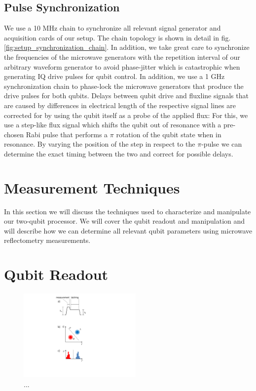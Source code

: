 \subsection{Pulse Synchronization}

We use a 10 MHz chain to synchronize all relevant signal generator and acquisition cards of our setup. The chain topology is shown in detail in fig. \ref{fig:setup_synchronization_chain}. In addition, we take great care to synchronize the frequencies of the microwave generators with the repetition interval of our arbitrary waveform generator to avoid phase-jitter which is catastrophic when generating IQ drive pulses for qubit control. In addition, we use a 1 GHz synchronization chain to phase-lock the microwave generators that produce the drive pulses for both qubits. Delays between qubit drive and fluxline signals that are caused by differences in electrical length of the respective signal lines are corrected for by using the qubit itself as a probe of the applied flux: For this, we use a step-like flux signal which shifts the qubit out of resonance with a pre-chosen Rabi pulse that performs a $\pi$ rotation of the qubit state when in resonance. By varying the position of the step in respect to the $\pi$-pulse we can determine the exact timing between the two and correct for possible delays.

\section{Measurement Techniques}

In this section we will discuss the techniques used to characterize and manipulate our two-qubit processor. We will cover the qubit readout and manipulation and will describe how we can determine all relevant qubit parameters using microwave reflectometry measurements.

\section{Qubit Readout}

\begin{figure}
\centering
\includegraphics[width=6cm]{./material/figures/measurement/readout}
\caption{...}
\label{fig:jba_drive_pulse}
\end{figure}


